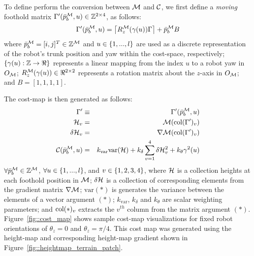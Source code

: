 			To define perform the conversion between ${\cal M}$ and ${\cal C}$, we first define a \emph{moving} foothold matrix $\Gamma'(\bar{p}^{{\cal M}}_{b},u) \in {\Bbb Z}^{2\times4}$, as follows:
				\begin{equation}
					\Gamma'(\bar{p}^{{\cal M}}_{b},u) = \left\lceil R_{z}^{{\cal M}}(\gamma(u))\Gamma \right\rceil + \bar{p}^{{\cal M}}_{b} B \\
				\end{equation}
			where  $\bar{p}^{{\cal M}}_{b} = [i,j]^T\in{\Bbb Z}^{{\cal M}}$ and $u \in \left\{1,...,l\right\}$ are used as a discrete representation of the robot's trunk position and yaw within the cost-space, respectively; $\left\{\gamma(u) : {\Bbb Z} \rightarrow \Re \right\}$ represents a linear mapping from the index $u$ to a robot yaw in $O_{{\cal M}}$; $R_{z}^{{\cal M}}(\gamma(u))\in\Re^{2\times2}$ represents a rotation matrix about the $z$-axis in $O_{{\cal M}}$; and $B = [1,1,1,1]$. 

			The cost-map is then generated as follows:
				\begin{eqnarray}
					\Gamma'	 				&\equiv& \Gamma'(\bar{p}^{{\cal M}}_{b},u) \nonumber \\
					{\cal H}_{v} 			&=& {\cal M}(\text{col}(\Gamma')_{v})	 \nonumber\\
					\delta {\cal H}_{v} 	&=& \nabla {\cal M}(\text{col}(\Gamma')_{v}) \nonumber\\
					{\cal C}(\bar{p}^{{\cal M}}_{b},u) 		&=& k_{\text{var}} \text{var}({\cal H}) + k_{\delta}\sum_{v=1}^{4} \delta {\cal H}_{v}^{2} + k_{\theta} \gamma^{2}(u) 
				\end{eqnarray}
			$\forall \bar{p}^{{\cal M}}_{b} \in \mathbb{Z}^{{\cal M}}$, $\forall u \in \left\{1,...,l\right\}$, and  $v \in \left\{1,2,3,4\right\}$, where ${\cal H}$ is a collection heights at each foothold position in ${\cal M}$; $\delta{\cal H}$ is a collection of corresponding elements from the gradient matrix $\nabla {\cal M}$; $\text{var}(*)$ is generates the variance between the elements of a vector argument $(*)$; $k_{\text{var}}$, $k_{\delta}$ and $k_{\theta}$ are scalar weighting parameters; and $\text{col}(*)_{v}$ extracts the $v^{th}$ column from the matrix argument $(*)$. Figure~\ref{fig::cost_map} shows sample cost-map visualizations for fixed robot orientations of $\theta_{z}=0$ and $\theta_{z}=\pi/4$. This cost map was generated using the height-map and corresponding height-map gradient shown in Figure~\ref{fig::heightmap_terrain_patch}.

